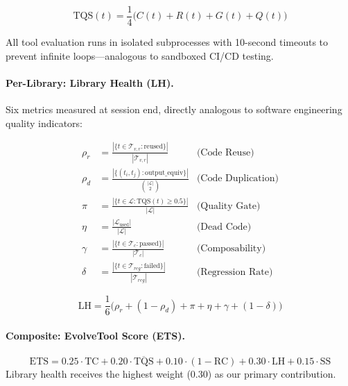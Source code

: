 \documentclass[]{ceurart}
\begin{document}
\begin{equation}
\text{TQS}(t) = \frac{1}{4}\bigl(C(t) + R(t) + G(t) + Q(t)\bigr)
\label{eq:tqs}
\end{equation}

All tool evaluation runs in isolated subprocesses with 10-second timeouts to prevent infinite loops---analogous to sandboxed CI/CD testing.

\paragraph{Per-Library: Library Health (LH).} Six metrics measured at session end, directly analogous to software engineering quality indicators:

\begin{align}
\rho_r &= \frac{|\{t \in \mathcal{T}_{v,r} : \text{reused}\}|}{|\mathcal{T}_{v,r}|} & \text{(Code Reuse)} \label{eq:reuse} \\[2pt]
\rho_d &= \frac{|\{(t_i,t_j) : \text{output\_equiv}\}|}{\binom{|\mathcal{L}|}{2}} & \text{(Code Duplication)} \label{eq:redund} \\[2pt]
\pi &= \frac{|\{t \in \mathcal{L} : \text{TQS}(t) \geq 0.5\}|}{|\mathcal{L}|} & \text{(Quality Gate)} \label{eq:prec} \\[2pt]
\eta &= \frac{|\mathcal{L}_{\text{used}}|}{|\mathcal{L}|} & \text{(Dead Code)} \label{eq:eff} \\[2pt]
\gamma &= \frac{|\{t \in \mathcal{T}_c : \text{passed}\}|}{|\mathcal{T}_c|} & \text{(Composability)} \label{eq:comp} \\[2pt]
\delta &= \frac{|\{t \in \mathcal{T}_{reg} : \text{failed}\}|}{|\mathcal{T}_{reg}|} & \text{(Regression Rate)} \label{eq:reg}
\end{align}

\begin{equation}
\text{LH} = \frac{1}{6}\bigl(\rho_r + (1{-}\rho_d) + \pi + \eta + \gamma + (1{-}\delta)\bigr)
\label{eq:lh}
\end{equation}

\paragraph{Composite: EvolveTool Score (ETS).}
\begin{equation}
\text{ETS} = 0.25 \cdot \text{TC} + 0.20 \cdot \overline{\text{TQS}} + 0.10 \cdot (1{-}\text{RC}) + 0.30 \cdot \text{LH} + 0.15 \cdot \text{SS}
\label{eq:ets}
\end{equation}
Library health receives the highest weight (0.30) as our primary contribution.
\end{document}
